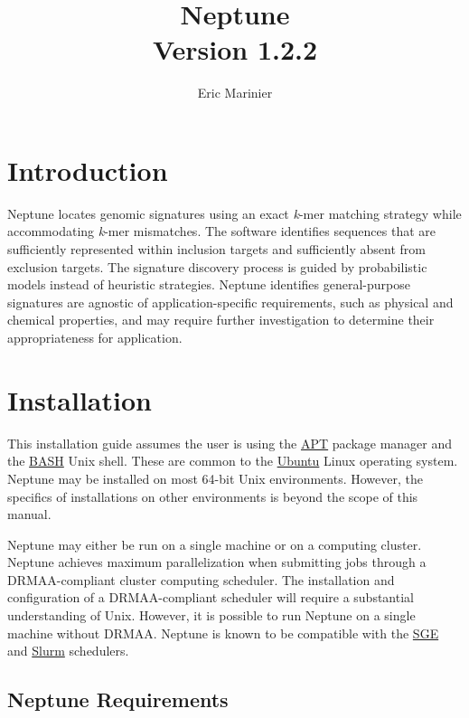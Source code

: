 \documentclass[a4paper,10pt]{article}
\title{Neptune\\ \normalsize Version 1.2.2}
\author{Eric Marinier}
\begin{document}
\maketitle

\newpage
\tableofcontents

\newpage
\section{Introduction}

Neptune locates genomic signatures using an exact \textit{k}-mer matching strategy while accommodating \textit{k}-mer mismatches. The software identifies sequences that are sufficiently represented within inclusion targets and sufficiently absent from exclusion targets. The signature discovery process is guided by probabilistic models instead of heuristic strategies. Neptune identifies general-purpose signatures are agnostic of application-specific requirements, such as physical and chemical properties, and may require further investigation to determine their appropriateness for application.

\newpage
\section{Installation}

This installation guide assumes the user is using the \href{https://help.ubuntu.com/community/AptGet/Howto}{APT} package manager and the \href{https://en.wikipedia.org/wiki/Bash_(Unix_shell)}{BASH} Unix shell. These are common to the \href{https://en.wikipedia.org/wiki/Ubuntu_(operating_system)}{Ubuntu} Linux operating system. Neptune may be installed on most 64-bit Unix environments. However, the specifics of installations on other environments is beyond the scope of this manual.

Neptune may either be run on a single machine or on a computing cluster. Neptune achieves maximum parallelization when submitting jobs through a DRMAA-compliant cluster computing scheduler. The installation and configuration of a DRMAA-compliant scheduler will require a substantial understanding of Unix. However, it is possible to run Neptune on a single machine without DRMAA. Neptune is known to be compatible with the \href{http://gridscheduler.sourceforge.net/}{SGE} and \href{http://slurm.schedmd.com/}{Slurm} schedulers.

\subsection{Neptune Requirements}
\end{document}

